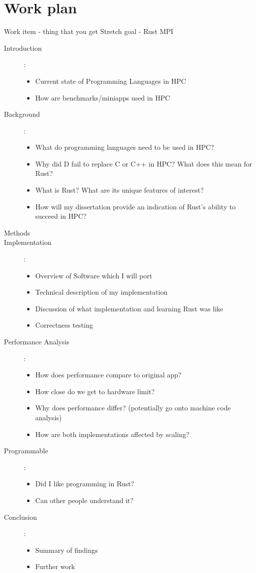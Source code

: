 \documentclass{report}[a4]
\begin{document}
\chapter{Work plan} %

Work item - thing that you get
Stretch goal - Rust MPI
\begin{description}
  \item[Introduction]:
  \begin{itemize}
    \item Current state of Programming Languages in HPC
    \item How are benchmarks/miniapps used in HPC
  \end{itemize}

  \item[Background]:
    \begin{itemize}
    \item What do programming languages need to be used in HPC?
    \item Why did D fail to replace C or C++ in HPC? What does this mean for Rust?
    \item What is Rust? What are its unique features of interest?
    \item How will my dissertation provide an indication of Rust's ability to succeed in HPC?
  \end{itemize}
  \item[Methods]
  \item[Implementation]:
  \begin{itemize}
    \item Overview of Software which I will port
    \item Technical description of my implementation
    \item Discussion of what implementation and learning Rust was like
    \item Correctness testing
  \end{itemize}
  \item[Performance Analysis]:
  \begin{itemize}
    \item How does performance compare to original app?
    \item How close do we get to hardware limit?
    \item Why does performance differ? (potentially go onto machine code analysis)
    \item How are both implementations affected by scaling?
  \end{itemize}
  \item[Programmable]:
  \begin{itemize}
    \item Did I like programming in Rust?
    \item Can other people understand it?
  \end{itemize}
  \item[Conclusion] :
  \begin{itemize}
    \item Summary of findings
    \item Further work
  \end{itemize}
\end{description}
\end{document}
